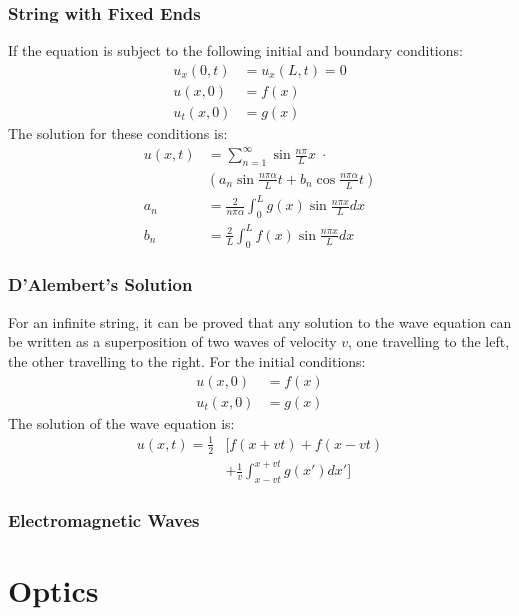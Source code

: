 \documentclass[11pt, letterpaper]{article}
\begin{document}
\begin{multicols*}{3}
\subsubsection{String with Fixed Ends}
If the equation is subject to the following initial and boundary conditions:
\begin{align*}
  u_x(0, t) &= u_x(L, t) = 0 \\
  u(x, 0) &= f(x) \\
  u_t(x, 0) &= g(x)
\end{align*}
The solution for these conditions is:
\begin{align*}
  u(x, t) &= \sum_{n=1}^{\infty}\sin{\frac{n\pi}{L} x} \; \cdot \\
  &\left( a_n\sin{\frac{n \pi \alpha}{L} t}
    + b_n\cos{\frac{n \pi \alpha}{L} t} \right) \\
  a_n &= \frac{2}{n \pi \alpha}\int_0^L g(x)\sin\frac{n \pi x}{L} dx \\
  b_n &= \frac{2}{L}\int_0^L f(x)\sin\frac{n \pi x}{L} dx
\end{align*}
\subsubsection{D'Alembert's Solution}
For an infinite string, it can be proved that any solution to the wave equation
can be written as a superposition of two waves of velocity $v$, one travelling
to the left, the other travelling to the right. For the initial conditions:
\begin{align*}
  u(x, 0) &= f(x) \\
  u_t(x, 0) &= g(x)
\end{align*}
The solution of the wave equation is:
\begin{align*}
  u(x, t) = \frac{1}{2} &\bigg[ f(x+vt) + f(x-vt)  \\
  &+ \frac{1}{v}\int_{x-vt}^{x+vt}g(x') dx' \bigg]
\end{align*}
\subsubsection{Electromagnetic Waves}
\section{Optics}

\end{multicols*}
\end{document}
